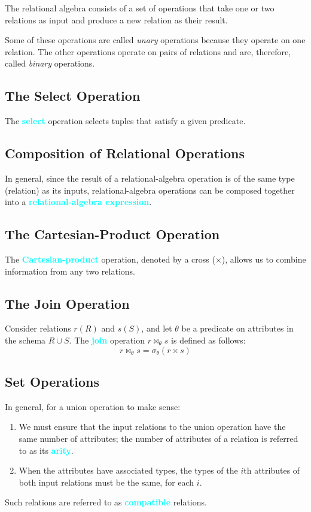 \documentclass[a4paper,12pt,twoside,openany]{book}
\newcommand{\textcy}[1]{\textbf{\textcolor{cyan}{#1}}}
\begin{document}
The relational algebra consists of a set of operations that take one or two relations as input and produce a new relation as their result.

Some of these operations are called \textit{unary} operations because they operate on one relation. The other operations operate on pairs of relations and are, therefore, called \textit{binary} operations.

\subsection{The Select Operation}

The \textcy{select} operation selects tuples that satisfy a given predicate.

\subsection{Composition of Relational Operations}

In general, since the result of a relational-algebra operation is of the same type (relation) as its inputs, relational-algebra operations can be composed together into a \textcy{relational-algebra expression}.

\subsection{The Cartesian-Product Operation}

The \textcy{Cartesian-product} operation, denoted by a cross ($\times$), allows us to combine information from any two relations.

\subsection{The Join Operation}

Consider relations $r(R)$ and $s(S)$, and let $\theta$ be a predicate on attributes in the schema $R\cup S$. The \textcy{join} operation $r\Join_{\theta}s$ is defined as follows: $$r\Join_{\theta}s=\sigma_{\theta}(r\times s)$$

\subsection{Set Operations}

In general, for a union operation to make sense:
\begin{enumerate}
    \item We must ensure that the input relations to the union operation have the same number of attributes; the number of attributes of a relation is referred to as its \textcy{arity}.
    \item When the attributes have associated types, the types of the $i$th attributes of both input relations must be the same, for each $i$.
\end{enumerate}
Such relations are referred to as \textcy{compatible} relations.
\end{document}
